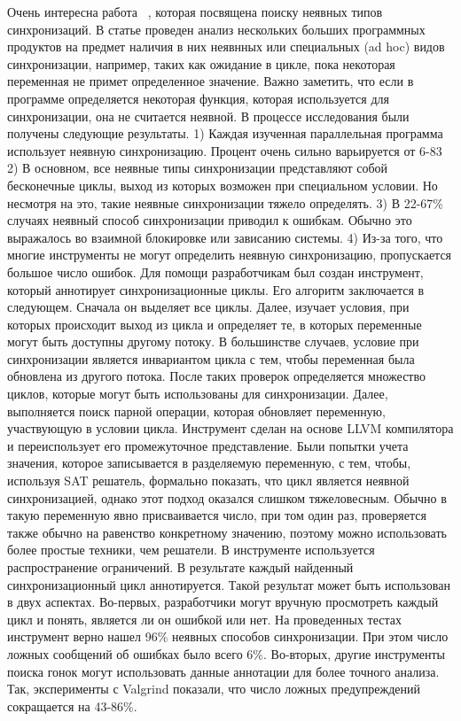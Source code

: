 Очень интересна работа ~\cite{Xiong:2010}, которая посвящена поиску неявных типов синхронизаций.
В статье проведен анализ нескольких больших программных продуктов на предмет наличия в них неявнных или специальных (ad hoc) видов синхронизации, например, таких как ожидание в цикле, пока некоторая переменная не примет определенное значение. Важно заметить, что если в программе определяется некоторая функция, которая используется для синхронизации, она не считается неявной.
В процессе исследования были получены следующие результаты.
1) Каждая изученная параллельная программа использует неявную синхронизацию. 
Процент очень сильно варьируется от 6-83%
2) В основном, все неявные типы синхронизации представляют собой бесконечные циклы, выход из которых возможен при специальном условии. Но несмотря на это, такие неявные синхронизации тяжело определять.
3) В 22-67\% случаях неявный способ синхронизации приводил к ошибкам. Обычно это выражалось во взаимной блокировке или зависанию системы. 
4) Из-за того, что многие инструменты не могут определить неявную синхронизацию, пропускается большое число ошибок. 
Для помощи разработчикам был создан инструмент, который аннотирует синхронизационные циклы. Его алгоритм заключается в следующем. Сначала он выделяет все циклы. Далее, изучает условия, при которых происходит выход из цикла и определяет те, в которых переменные могут быть доступны другому потоку. В большинстве случаев, условие при синхронизации является инвариантом цикла с тем, чтобы переменная была обновлена из другого потока. После таких проверок определяется множество циклов, которые могут быть использованы для синхронизации. Далее, выполняется поиск парной операции, которая обновляет переменную, участвующую в условии цикла. Инструмент сделан на основе LLVM  компилятора и переиспользует его промежуточное представление. Были попытки учета значения, которое записывается в разделяемую переменную, с тем, чтобы, используя SAT решатель, формально показать, что цикл является неявной синхронизацией, однако этот подход оказался слишком тяжеловесным. Обычно в такую переменную явно присваивается число, при том один раз, проверяется также обычно на равенство конкретному значению, поэтому можно использовать более простые техники, чем решатели. В инструменте используется распространение ограничений. 
В результате каждый найденный синхронизационный цикл аннотируется. Такой результат может быть использован в двух аспектах. Во-первых, разработчики могут вручную просмотреть каждый цикл и понять, является ли он ошибкой или нет. На проведенных тестах инструмент верно нашел 96\% неявных способов синхронизации. При этом число ложных сообщений об ошибках было всего 6\%. Во-вторых, другие инструменты поиска гонок могут использовать данные аннотации для более точного анализа. Так, эксперименты с Valgrind показали, что число ложных предупреждений сокращается на 43-86\%. 

